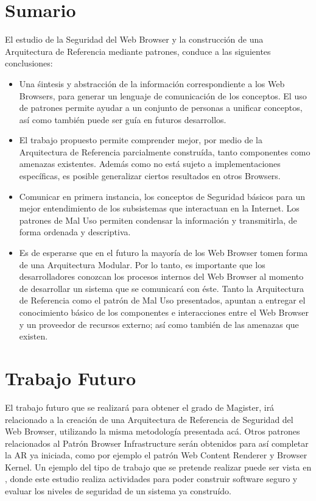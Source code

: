 \section{Sumario}
El estudio de la Seguridad del Web Browser y la construcción de una Arquitectura de Referencia mediante patrones, conduce a las siguientes conclusiones:
\begin{itemize}
	\item Una śintesis y abstracción de la información correspondiente a los Web Browsers, para generar un lenguaje de comunicación de los conceptos. El uso de patrones permite ayudar a un conjunto de personas a unificar conceptos, así como también puede ser guía en futuros desarrollos.
	\item El trabajo propuesto permite comprender mejor, por medio de la Arquitectura de Referencia parcialmente construída, tanto componentes como amenazas existentes. Además como no está sujeto a implementaciones específicas, es posible generalizar ciertos resultados en otros Browsers.
	\item Comunicar en primera instancia, los conceptos de Seguridad básicos para un mejor entendimiento de los subsistemas que interactuan en la Internet. Los patrones de Mal Uso permiten condensar la información y transmitirla, de forma ordenada y descriptiva.
	\item Es de esperarse que en el futuro la mayoría de los Web Browser tomen forma de una Arquitectura Modular. Por lo tanto, es importante que los desarrolladores conozcan los procesos internos del Web Browser al momento de desarrollar un sistema que se comunicará con éste. Tanto la Arquitectura de Referencia como el patrón de Mal Uso presentados, apuntan a entregar el conocimiento básico de los componentes e interacciones entre el Web Browser y un proveedor de recursos externo; así como también de las amenazas que existen.
	
\end{itemize}


\section{Trabajo Futuro}
El trabajo futuro que se realizará para obtener el grado de Magister, irá relacionado a la creación de una Arquitectura de Referencia de Seguridad del Web Browser, utilizando la misma metodología presentada acá. Otros patrones relacionados al Patrón Browser Infrastructure serán obtenidos para así completar la AR ya iniciada, como por ejemplo el patrón Web Content Renderer y Browser Kernel. Un ejemplo del tipo de trabajo que se pretende realizar puede ser vista en \cite{fernandez2014security}, donde este estudio realiza actividades para poder construir software seguro y evaluar los niveles de seguridad de un sistema ya construído.

